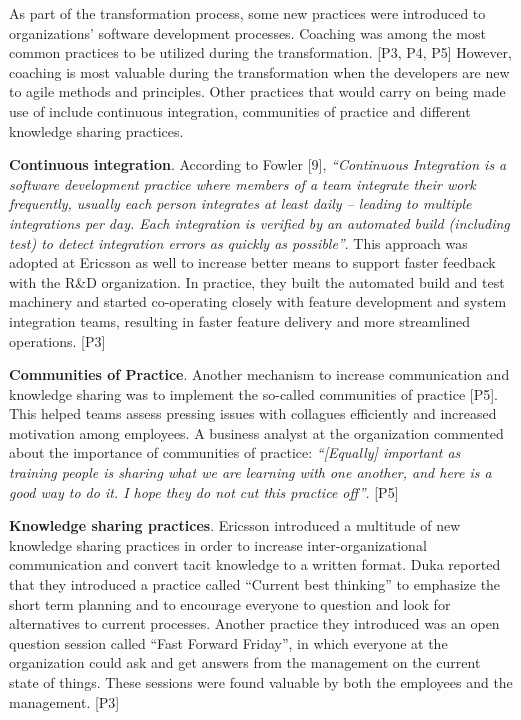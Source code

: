 As part of the transformation process, some new practices were
introduced to organizations' software development processes. Coaching
was among the most common practices to be utilized during the
transformation. [P3, P4, P5] However, coaching is most valuable during
the transformation when the developers are new to agile methods and
principles. Other practices that would carry on being made use of
include continuous integration, communities of practice and different
knowledge sharing practices.

{\bfseries Continuous integration}. According to Fowler [9],
\textit{``Continuous Integration is a software development practice
where members of a team integrate their work frequently, usually each
person integrates at least daily – leading to multiple integrations
per day. Each integration is verified by an automated build (including
test) to detect integration errors as quickly as possible''}. This
approach was adopted at Ericsson as well to increase better means to
support faster feedback with the R\&D organization. In practice, they
built the automated build and test machinery and started co-operating
closely with feature development and system integration teams, resulting
in faster feature delivery and more streamlined operations. [P3]

{\bfseries Communities of Practice}. Another mechanism to increase
communication and knowledge sharing was to implement the so-called
communities of practice [P5]. This helped teams assess pressing issues
with collagues efficiently and increased motivation among employees.
A business analyst at the organization commented about the importance
of communities of practice: \textit{``[Equally] important as training
people is sharing what we are learning with one another, and here is a
good way to do it. I hope they do not cut this practice off''}. [P5]

{\bfseries Knowledge sharing practices}. Ericsson introduced a
multitude of new knowledge sharing practices in order to increase
inter-organizational communication and convert tacit knowledge to a
written format. Duka reported that they introduced a practice called
``Current best thinking'' to emphasize the short term planning and to
encourage everyone to question and look for alternatives to current
processes. Another practice they introduced was an open question session
called ``Fast Forward Friday'', in which everyone at the organization
could ask and get answers from the management on the current state of
things. These sessions were found valuable by both the employees and the
management. [P3]
